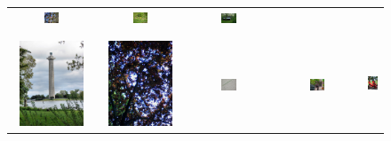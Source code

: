 \documentclass[10pt,journal,compsoc]{IEEEtran}
\begin{document}
\begin{figure}[th]
{{\begin{center}
\begin{tabular}{@{}c@{\,\,\,}c@{\,\,\,}c@{\,\,\,}c@{\,\,\,}c@{\,\,\,}}
\includegraphics[width=0.19\textwidth]{imggrid/falseposi/8.jpg} &
\includegraphics[width=0.19\textwidth]{imggrid/falseposi/9.jpg} &
\includegraphics[width=0.19\textwidth]{imggrid/falseposi/10.jpg} \\
\\[-6pt]
\hline
\\[-6pt]
\includegraphics[height=1in]{imggrid/falseposi/11.jpg} &
\includegraphics[height=1in]{imggrid/falseposi/12.jpg} &
\includegraphics[width=0.19\textwidth]{imggrid/falseposi/13.jpg} &
\includegraphics[width=0.19\textwidth]{imggrid/falseposi/14.jpg} &
\includegraphics[height=1in]{imggrid/falseposi/15.jpg} \\

\end{tabular}
\end{center}}}
\end{figure}
\end{document}
